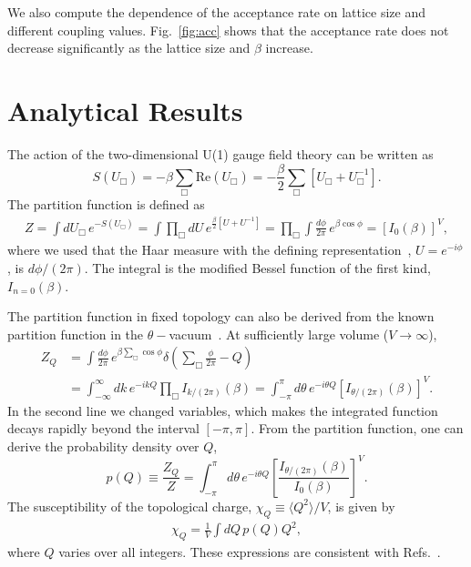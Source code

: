 \documentclass[a4paper,11pt]{article}
\begin{document}
We also compute the dependence of the acceptance rate on lattice size and different coupling values. Fig.~\ref{fig:acc} shows that the acceptance rate does not decrease significantly as the lattice size and $\beta$ increase.

\section{Analytical Results}
\label{app:exact}


The action of the two-dimensional U(1) gauge field theory can be written as
\begin{equation}
S(U_{\Box}) = -\beta \sum_{\Box}\text{Re}(U_{\Box}) = -\frac{\beta}{2} \sum_{\Box} [U_{\Box} + U_{\Box}^{-1}].
\end{equation}
The partition function is defined as
\begin{align}
    Z = \int dU_{\Box}\, e^{-S(U_{\Box})}
      = \int \prod_{\Box} dU\, e^{\frac{\beta}{2}[U + U^{-1}]}
      = \prod_{\Box} \int \frac{d\phi}{2\pi}\, e^{\beta \cos{\phi}}
      = [I_0(\beta)]^V,
\end{align}
where we used that the Haar measure with the defining representation~\cite{Kanwar:2021wzm}, $U=e^{-i\phi}$, is $d\phi/(2\pi)$. The integral is the modified Bessel function of the first kind, $I_{n=0}(\beta)$.

The partition function in fixed topology can also be derived from the known partition function in the $\theta-$vacuum~\cite{Kovacs:1995nn,Bonati:2019ylr,Albandea:2021lvl}. At sufficiently large volume ($V\rightarrow\infty$),
\begin{align}
    Z_Q & = \int \frac{d\phi}{2\pi}\, e^{\beta \sum_{\Box}\cos{\phi}} \delta\left(\sum_{\Box} \frac{\phi}{2\pi} - Q\right)
\nonumber\\
    &    = \int_{-\infty}^{\infty} dk\, e^{-ik Q} \prod_{\Box} I_{k/(2\pi)}(\beta)
     = \int_{-\pi}^{\pi}  d\theta\, e^{-i\theta Q}[I_{\theta/(2\pi)}(\beta)]^V.
\end{align}
In the second line we changed variables, which makes the integrated function decays rapidly beyond the interval $[-\pi, \pi]$. From the partition function, one can derive the probability density over $Q$,
\begin{equation}
    p(Q) \equiv \frac{Z_Q}{Z} = \int_{-\pi}^{\pi}  d\theta\, e^{-i\theta Q}\left[ \frac{I_{\theta/(2\pi)}(\beta)}{I_0(\beta)} \right]^V.
\end{equation}
The susceptibility of the topological charge, $\chi_Q\equiv \langle Q^2 \rangle /V$, is given by
\begin{align}
    \chi_Q = \frac{1}{V} \int dQ\, p(Q) Q^2,
\end{align}
where $Q$ varies over all integers. These expressions are consistent with Refs.~\cite{Kovacs:1995nn,Bonati:2019ylr,Bonati:2019olo,Albandea:2021lvl}.
\end{document}

